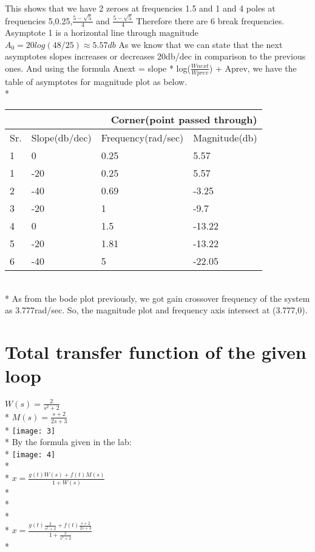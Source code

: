 \documentclass{article}
\begin{document}
 This shows that we have 2 zeroes at frequencies 1.5 and 1 and 4 poles at frequencies 5,0.25,$\frac{5-\sqrt{5}}{4}$ and $\frac{5-\sqrt{5}}{4}$ Therefore there are 6 break frequencies.
 Asymptote 1 is a horizontal line through magnitude $A_{0} = 20log(48/25) \approx 5.57 db$
 As we know that we can state that the next asymptotes slopes increases or decreases 20db/dec in comparison to the previous ones. And using the formula Anext = slope * log($\frac{Wnext}{Wprev}$) + Aprev, we have the table of asymptotes for magnitude plot as below.\\*
 \begin{tabular}{ |p{1cm}||p{3cm}|p{3cm}|p{3cm}|  }
 \hline
 \multicolumn{4}{|r|}{Corner(point passed through)} \\
 \hline
 Sr.& Slope(db/dec) &Frequency(rad/sec)& Magnitude(db)\\
 \hline
 1   & 0    &0.25&   5.57\\
 1 &   -20  & 0.25   &5.57\\
 2 & -40 & 0.69&  -3.25\\
 3    &-20 & 1&  -9.7\\
 4&   0  & 1.5 & -13.22\\
 5& -20  & 1.81   &-13.22\\
 6& -40  & 5 &-22.05\\
 \hline
\end{tabular}\\*
As from the bode plot previously, we got gain crossover frequency of the system as 3.777rad/sec. So, the magnitude plot and frequency axis intersect at (3.777,0).

\section{Total transfer function of the given loop}
$W(s) = {\displaystyle\frac{2}{s^2+2}}$\\*
$M(s) = {\displaystyle\frac{s+2}{2s+3}}$\\*
\texttt{[image: 3]}\\*
By the formula given in the lab:\\*
\texttt{[image: 4]}\\*\\*
$x = {\displaystyle\frac{g(t)W(s)+f(t)M(s)}{1+W(s)}}$\\*\\*\\*\\*
$x = {\displaystyle\frac{g(t)\frac{2}{s^2+2}+f(t)\frac{s+2}{2s+3}}{1+\frac{2}{s^2+2}}}$\\*
\end{document}
